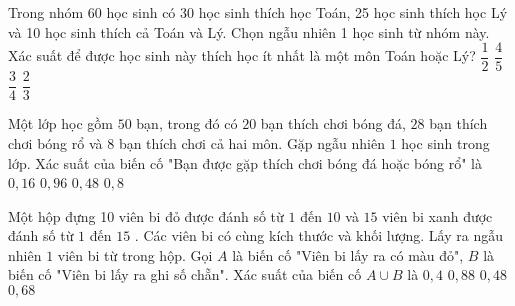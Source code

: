\begin{ex}
	Trong nhóm 60 học sinh có 30 học sinh thích học Toán, 25 học sinh thích học Lý và 10 học sinh thích cả Toán và Lý. Chọn ngẫu nhiên 1 học sinh từ nhóm này. Xác suất để được học sinh này thích học ít nhất là một môn Toán hoặc Lý?
	\choice
	{\True $\dfrac{1}{2}$}
	{$\dfrac{4}{5}$}
	{\True $\dfrac{3}{4}$}
	{$\dfrac{2}{3}$}
\end{ex}
\begin{ex}%
	Một lớp học gồm $50$ bạn, trong đó có $20$ bạn thích chơi bóng đá, $28$ bạn thích chơi bóng rổ và $8$ bạn thích chơi cả hai môn. Gặp ngẫu nhiên $1$ học sinh trong lớp. Xác suất của biến cố "Bạn được gặp thích chơi bóng đá hoặc bóng rổ" là
	\choice
	{$0,16$}
	{$0,96$}
	{$0,48$}
	{\True $0,8$}
\end{ex}
\begin{ex}%
	Một hộp đựng 10 viên bi đỏ được đánh số từ $1$ đến $10$ và $15$ viên bi xanh được đánh số từ $1$ đến $15$ . Các viên bi có cùng kích thước và khối lượng. Lấy ra ngẫu nhiên $1$ viên bi từ trong hộp. Gọi $A$ là biến cố "Viên bi lấy ra có màu đỏ", $B$ là biến cố "Viên bi lấy ra ghi số chẵn". Xác suất của biến cố $A \cup B$ là
	\choice
	{$0,4$}
	{$0,88$}
	{$0,48$}
	{\True $0,68$}
\end{ex}

